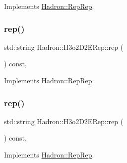 Implements \mbox{\hyperlink{structHadron_1_1RepRep_ab3213025f6de249f7095892109575fde}{Hadron\+::\+Rep\+Rep}}.

\mbox{\label{structHadron_1_1H3o2D2ERep_a62c37bd67dbe2ba7fd36b57f0a069aa7}} 
\subsubsection{\texorpdfstring{rep()}{rep()}\hspace{0.1cm}{\footnotesize\ttfamily [2/5]}}
{\footnotesize\ttfamily std\+::string Hadron\+::\+H3o2\+D2\+E\+Rep\+::rep (\begin{DoxyParamCaption}{ }\end{DoxyParamCaption}) const\hspace{0.3cm}{\ttfamily [inline]}, {\ttfamily [virtual]}}



Implements \mbox{\hyperlink{structHadron_1_1RepRep_ab3213025f6de249f7095892109575fde}{Hadron\+::\+Rep\+Rep}}.

\mbox{\label{structHadron_1_1H3o2D2ERep_a62c37bd67dbe2ba7fd36b57f0a069aa7}} 
\subsubsection{\texorpdfstring{rep()}{rep()}\hspace{0.1cm}{\footnotesize\ttfamily [3/5]}}
{\footnotesize\ttfamily std\+::string Hadron\+::\+H3o2\+D2\+E\+Rep\+::rep (\begin{DoxyParamCaption}{ }\end{DoxyParamCaption}) const\hspace{0.3cm}{\ttfamily [inline]}, {\ttfamily [virtual]}}



Implements \mbox{\hyperlink{structHadron_1_1RepRep_ab3213025f6de249f7095892109575fde}{Hadron\+::\+Rep\+Rep}}.

\mbox{\label{structHadron_1_1H3o2D2ERep_a62c37bd67dbe2ba7fd36b57f0a069aa7}} 
